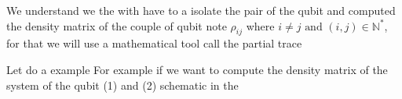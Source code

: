 We understand we the  with have to a isolate the pair of the qubit and computed the density matrix of the 
couple of qubit note $\rho_{ij}$ where $i \neq j \text{ and } (i,j) \in \mathbb{N}^*$, for that we will use a mathematical tool call the partial
trace \cite{bradley_at_2020} 


Let do a example
For example if we want to compute the density matrix of the system of the qubit (1) and (2) schematic 
in the  




